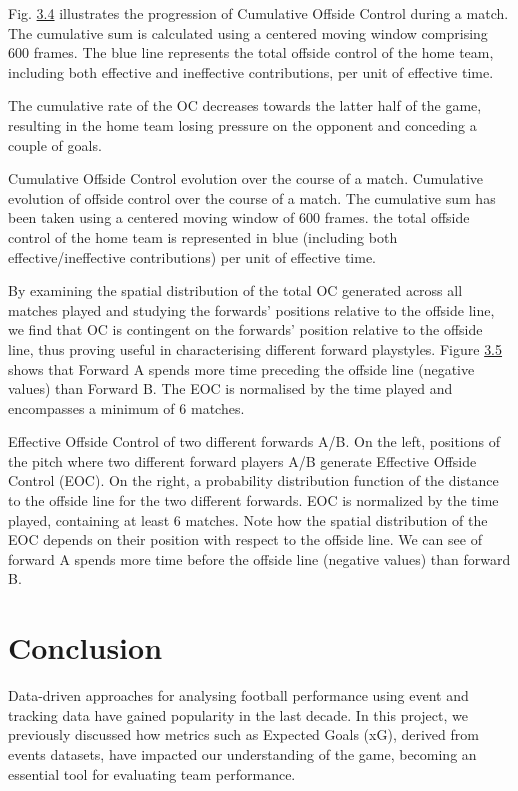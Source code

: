 \documentclass[twoside,nohyper]{tufte-book}
\begin{document}
Fig. \protect\hyperlink{f3.4}{3.4} illustrates the
progression of Cumulative Offside Control during a match. The cumulative
sum is calculated using a centered moving window comprising 600 frames.
The blue line represents the total offside control of the home team,
including both effective and ineffective contributions, per unit of
effective time.

The cumulative rate of the OC decreases towards the latter half of the
game, resulting in the home team losing pressure on the opponent and
conceding a couple of goals.

Cumulative Offside Control evolution over the course of a
match. Cumulative evolution of offside control over the course of a
match. The cumulative sum has been taken using a centered moving window
of 600 frames. the total offside control of the home team is represented
in blue (including both effective/ineffective contributions) per unit of
effective time.

By examining the spatial distribution of the total OC generated across
all matches played and studying the forwards' positions relative to the
offside line, we find that OC is contingent on the forwards' position
relative to the offside line, thus proving useful in characterising
different forward playstyles. Figure \protect\hyperlink{f3.5}{3.5} shows that Forward A spends more time preceding the
offside line (negative values) than Forward B. The EOC is normalised by
the time played and encompasses a minimum of 6 matches.

Effective Offside Control of two different forwards A/B. On
the left, positions of the pitch where two different forward players A/B
generate Effective Offside Control (EOC). On the right, a probability
distribution function of the distance to the offside line for the two
different forwards. EOC is normalized by the time played, containing at
least 6 matches. Note how the spatial distribution of the EOC depends on
their position with respect to the offside line. We can see of forward A
spends more time before the offside line (negative values) than forward
B.

\hypertarget{conclusion-1}{%
\chapter{Conclusion}\label{conclusion-1}}

Data-driven approaches for analysing football performance using event
and tracking data have gained popularity in the last decade. In this
project, we previously discussed how metrics such as Expected Goals
(xG), derived from events datasets, have impacted our understanding of
the game, becoming an essential tool for evaluating team performance.
\end{document}
